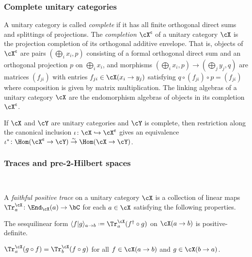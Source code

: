 \documentclass[12pt,reqno]{amsart}
\newcommand{\bkt}[2]{\langle #1|#2 \rangle}
\newcommand{\defn}[1]{\emph{#1}}
\newcommand{\cent}{\textup{\textcent}}
\DeclareRobustCommand{\coloneq}{\mathrel{\vcenter{\baselineskip0.5ex\lineskiplimit0pt\hbox{\scriptsize{\upshape.}}\hbox{\scriptsize{\upshape.}}}}=}
\begin{document}
\subsubsection{Complete unitary categories}
\label{completeunitarycategories}
A unitary category is called \defn{complete} if it has all finite orthogonal direct sums and splittings of projections. The \defn{completion} $\cX^\cent$ of a unitary category $\cX$ is the projection completion of its orthogonal additive envelope. That is, objects of $\cX^\cent$ are pairs $(\bigoplus_ix_i,p)$ consisting of a formal orthogonal direct sum and an orthogonal projection $p$ on $\bigoplus_ix_i$, and morphisms $(\bigoplus_i x_i, p) \to (\bigoplus_j y_j, q)$ are matrices $(f_{ji})$ with entries $f_{ji} \in \cX(x_i\to y_j)$ satisfying $q \circ (f_{ji}) \circ p = (f_{ji})$ where composition is given by matrix multiplication. The linking algebras of a unitary category $\cX$ are the endomorphism algebras of objects in its completion $\cX^\cent$.

\begin{proposition}
  \label{3.3.12}
  If $\cX$ and $\cY$ are unitary categories and $\cY$ is complete, then restriction along the canonical inclusion $\iota\colon\cX\hookrightarrow\cX^{\cent}$ gives an equivalence $\iota^*\colon\Hom(\cX^{\cent}\to\cY)\overset\sim\to\Hom(\cX\to\cY)$.
\end{proposition}

\subsubsection{Traces and pre-2-Hilbert spaces}

\


\begin{definition}
\label{2hilbtrace}
  A \defn{faithful positive trace} on a unitary category $\cX$ is a collection of linear maps $\Tr_a^\cX\colon \End_\cX(a)\to \bC$ for each $a\in\cX$ satisfying the following properties.
  \begin{lst}
    \item[\upshape($\dag$Tr1)]\label{dagTr2}The sesquilinear form $\bkt{f}{g}_{a\to b}\coloneq \Tr^\cX_a(f^\dag\circ  g)$ on $\cX(a\to b)$ is positive-definite.
    \item[\upshape($\dag$Tr2)]\label{dagTr1} $\Tr^\cX_a(g\circ f)=\Tr^\cX_b(f\circ g)$ for all $f\in\cX(a\to b)$ and $g\in \cX(b\to a)$.
  \end{lst}
\end{definition}
\end{document}
